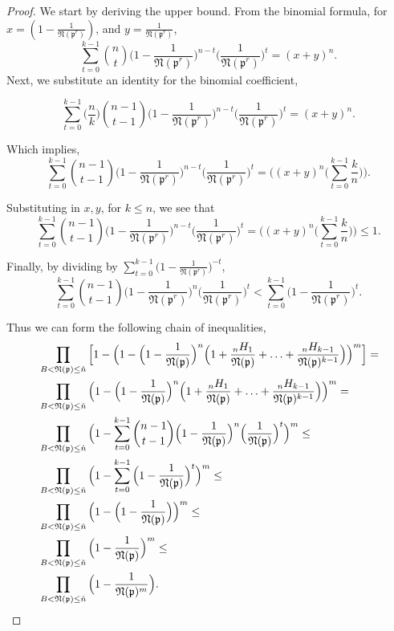 \documentclass[10pt,a4paper]{article}
\newcommand{\f}[1]{\mathfrak{#1}}
\begin{document}
	\begin{proof}
		We start by deriving the upper bound. 
		From the binomial formula, for $x=(1-\frac{1}{\f{N}(\f{p}^r)})$, and $y=\frac{1}{\f{N}(\f{p}^r)}$,
		$$\sum_{t=0}^{k-1}\binom{n}{t}\Big(1-\frac{1}{\f{N}(\f{p}^r)}\Big)^{n-t}\Big(\frac{1}{\f{N}(\f{p}^r)}\Big)^t=(x+y)^n.$$
		Next, we substitute an identity for the binomial coefficient,
		
		$$\sum_{t=0}^{k-1}\Big(\frac{n}{k}\Big)\binom{n-1}{t-1}\Big(1-\frac{1}{\f{N}(\f{p}^r)}\Big)^{n-t}\Big(\frac{1}{\f{N}(\f{p}^r)}\Big)^t=(x+y)^n.$$
		
		Which implies, 
		$$\sum_{t=0}^{k-1}\binom{n-1}{t-1}\Big(1-\frac{1}{\f{N}(\f{p}^r)}\Big)^{n-t}\Big(\frac{1}{\f{N}(\f{p}^r)}\Big)^t=\Big((x+y)^n\Big(\sum_{t=0}^{k-1}\frac{k}{n}\Big)\Big).$$
		
		Substituting in $x,y$, for $k\leq n$, we see that 
		$$\sum_{t=0}^{k-1}\binom{n-1}{t-1}\Big(1-\frac{1}{\f{N}(\f{p}^r)}\Big)^{n-t}\Big(\frac{1}{\f{N}(\f{p}^r)}\Big)^t=\Big((x+y)^n\Big(\sum_{t=0}^{k-1}\frac{k}{n}\Big)\Big)\leq1.$$
		
		Finally, by dividing by $\sum_{t=0}^{k-1}\Big(1-\frac{1}{\f{N}(\f{p}^r)}\Big)^{-t}$, 
		$$\sum_{t=0}^{k-1}\binom{n-1}{t-1}\Big(1-\frac{1}{\f{N}(\f{p}^r)}\Big)^{n}\Big(\frac{1}{\f{N}(\f{p}^r)}\Big)^t<\sum_{t=0}^{k-1}\Big(1-\frac{1}{\f{N}(\f{p}^r)}\Big)^t.$$
		
		Thus we can form the following chain of inequalities,
		\begin{align*}
			&\prod_{B<\f{N}(\f{p})\leq\hat{n}} \Big[1 - \Big(1 -\Big(1-\frac{1}{\f{N}(\f{p})}\Big)^n\Big(1+\frac{{}_nH_1}{\f{N}(\f{p})}+\mathellipsis+\frac{{}_nH_{k-1}}{\f{N}(\f{p})^{k-1}}\Big)\Big)^m\Big] = \\
			&\prod_{B<\f{N}(\f{p})\leq\hat{n}} \Big(1 -\Big(1-\frac{1}{\f{N}(\f{p})}\Big)^n\Big(1+\frac{{}_nH_1}{\f{N}(\f{p})}+\mathellipsis+\frac{{}_nH_{k-1}}{\f{N}(\f{p})^{k-1}}\Big)\Big)^m = \\
			&\prod_{B<\f{N}(\f{p})\leq\hat{n}} \Big(1 - \sum_{t=0}^{k-1}\binom{n-1}{t-1}\Big(1-\frac{1}{\f{N}(\f{p})}\Big)^n\Big(\frac{1}{\f{N}(\f{p})}\Big)^t\Big)^m \leq \\
			&\prod_{B<\f{N}(\f{p})\leq\hat{n}} \Big(1 - \sum_{t=0}^{k-1}\Big(1-\frac{1}{\f{N}(\f{p})}\Big)^t\Big)^m \leq \\
			&\prod_{B<\f{N}(\f{p})\leq\hat{n}} \Big(1 - \Big(1-\frac{1}{\f{N}(\f{p})}\Big)\Big)^m \leq \\
			&\prod_{B<\f{N}(\f{p})\leq\hat{n}} \Big(1-\frac{1}{\f{N}(\f{p})}\Big)^m \leq \\
			&\prod_{B<\f{N}(\f{p})\leq\hat{n}} \Big(1-\frac{1}{\f{N}(\f{p})^m}\Big). \\
		\end{align*}
		

\end{proof}
\end{document}
